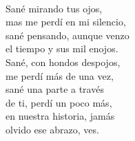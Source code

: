\begin{lyrics}
\\
Sané mirando tus ojos,\\
mas me perdí en mi silencio,\\
sané pensando, aunque venzo\\
el tiempo y sus mil enojos.\\
Sané, con hondos despojos,\\
me perdí más de una vez,\\
sané una parte a través\\
de ti, perdí un poco más,\\
en nuestra historia, jamás\\
olvido ese abrazo, ves.
\end{lyrics}

